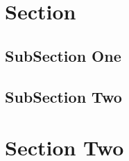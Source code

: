 \documentclass[12pt, twoside]{article}
\title{\vspace{-2cm}\runtitle\vspace{-5mm}}
\author{\runauthor\vspace{-5mm}}
\date{\today}
\begin{document}

\maketitle\thispagestyle{firststyle}

\section{Section}

\subsection{SubSection One}

\lipsum[2-4]

\subsection{SubSection Two}

\lipsum[3-5]

\section{Section Two}

\lipsum[1-5]
\end{document}
